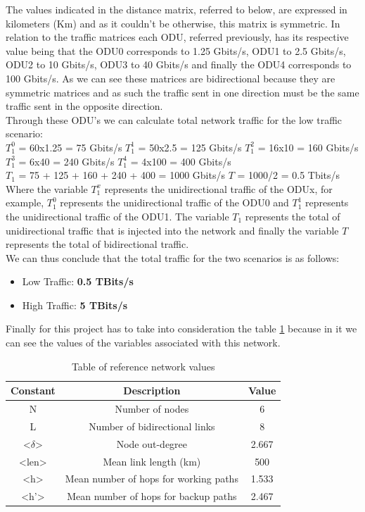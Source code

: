 The values indicated in the distance matrix, referred to below, are expressed in kilometers (Km) and as it couldn't be otherwise, this matrix is symmetric.
In relation to the traffic matrices each ODU, referred previously, has its respective value being that the ODU0 corresponds to 1.25 Gbits/s, ODU1 to 2.5 Gbits/s, ODU2 to 10 Gbits/s, ODU3 to 40 Gbits/s and finally the ODU4 corresponds to 100 Gbits/s.
As we can see these matrices are bidirectional because they are symmetric matrices and as such the traffic sent in one direction must be the same traffic sent in the opposite direction. \\

Through these ODU's we can calculate total network traffic for the low traffic scenario:\\

$T_1^0$ = 60x1.25 = 75 Gbits/s \qquad
$T_1^1$ = 50x2.5 = 125 Gbits/s \qquad
$T_1^2$ = 16x10 = 160 Gbits/s \\

$T_1^3$ = 6x40 = 240 Gbits/s \quad
$T_1^4$ = 4x100 = 400 Gbits/s \\

$T_{1}$ = 75 + 125 + 160 + 240 + 400 = 1000 Gbits/s \qquad
$T$ = 1000/2 = 0.5 Tbits/s\\

Where the variable $T_1^x$ represents the unidirectional traffic of the ODUx, for example, $T_1^0$ represents the unidirectional traffic of the ODU0 and $T_1^1$ represents the unidirectional traffic of the ODU1. The variable $T_{1}$ represents the total of unidirectional traffic that is injected into the network and finally the variable $T$ represents the total of bidirectional traffic.\\

We can thus conclude that the total traffic for the two scenarios is as follows:
\begin{itemize}
  \item Low Traffic: \textbf{0.5 TBits/s}
  \item High Traffic: \textbf{5 TBits/s}
\end{itemize}

Finally for this project has to take into consideration the table \ref{table_ref_net} because in it we can see the values of the variables associated with this network.
\begin{table}[h!]
\centering
\begin{tabular}{|| c | c | c||}
 \hline
 Constant & Description & Value \\
 \hline\hline
 N & Number of nodes & 6 \\
 L & Number of bidirectional links & 8 \\
 <$\delta$> & Node out-degree & 2.667 \\
 <len> & Mean link length (km) & 500 \\
 <h> & Mean number of hops for working paths & 1.533 \\
 <h'> & Mean number of hops for backup paths & 2.467 \\
 \hline
\end{tabular}
\caption{Table of reference network values}
\label{table_ref_net}
\end{table}

